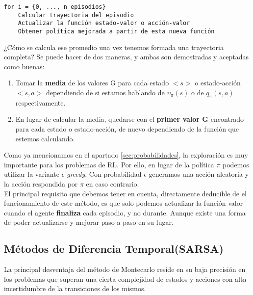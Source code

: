 \documentclass[11pt,fleqn]{book} %
\begin{document}
\begin{verbatim}
for i = {0, ..., n_episodios}
    Calcular trayectoria del episodio
    Actualizar la función estado-valor o acción-valor
    Obtener política mejorada a partir de esta nueva función
\end{verbatim}

¿Cómo se calcula ese promedio una vez tenemos formada una trayectoria completa? Se puede hacer de dos maneras, y ambas son demostradas y aceptadas como buenas: \\

\begin{enumerate}
	\item Tomar la \textbf{media} de los valores G para cada estado $<s>$ o estado-acción $<s,a>$ dependiendo de si estamos hablando de $\upsilon_\pi(s)$ o de $q_\pi(s,a)$ respectivamente. \\
	
	\item En lugar de calcular la media, quedarse con el \textbf{primer valor G} encontrado para cada estado o estado-acción, de nuevo dependiendo de la función que estemos calculando. \\
\end{enumerate}

Como ya mencionamos en el apartado \ref{sec:probabilidades}, la exploración es muy importante para los problemas de RL. Por ello, en lugar de la política $\pi$ podemos utilizar la variante \textit{$\epsilon$-greedy}. Con probabilidad $\epsilon$ generamos una acción aleatoria y la acción respondida por $\pi$ en caso contrario. \\

El principal requisito que debemos tener en cuenta, directamente deducible de el funcionamiento de este método, es que solo podemos actualizar la función valor cuando el agente \textbf{finaliza} cada episodio, y no durante. Aunque existe una forma de poder actualizarse y mejorar paso a paso en su lugar.

\subsection{Métodos de Diferencia Temporal(SARSA)}

La principal desventaja del método de Montecarlo reside en su baja precisión en los problemas que superan una cierta complejidad de estados y acciones con alta incertidumbre de la transiciones de los mismos.\\
\end{document}
